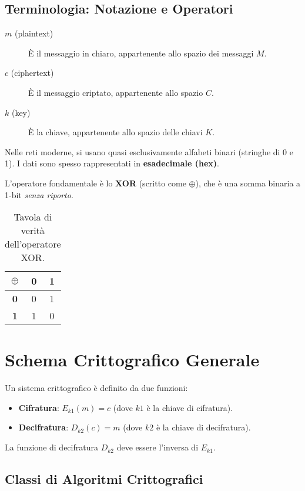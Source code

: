 \documentclass[../main.tex]{subfiles}
\begin{document}
\subsection{Terminologia: Notazione e Operatori}
\begin{description}
    \item[$m$ (plaintext)] È il messaggio in chiaro, appartenente allo spazio dei messaggi $M$.
    \item[$c$ (ciphertext)] È il messaggio criptato, appartenente allo spazio $C$.
    \item[$k$ (key)] È la chiave, appartenente allo spazio delle chiavi $K$.
\end{description}
Nelle reti moderne, si usano quasi esclusivamente alfabeti binari (stringhe di 0 e 1). I dati sono spesso rappresentati in \textbf{esadecimale (hex)}.

L'operatore fondamentale è lo \textbf{XOR} (scritto come $\oplus$), che è una somma binaria a 1-bit \emph{senza riporto}.

\begin{table}[h]
\centering
\begin{tabular}{c|cc}
\textbf{$\oplus$} & \textbf{0} & \textbf{1} \\
\midrule
\textbf{0} & 0 & 1 \\
\textbf{1} & 1 & 0 \\
\end{tabular}
\caption{Tavola di verità dell'operatore XOR.}
\end{table}

\section{Schema Crittografico Generale}
Un sistema crittografico è definito da due funzioni:
\begin{itemize}
    \item \textbf{Cifratura}: $E_{k1}(m) = c$ (dove $k1$ è la chiave di cifratura).
    \item \textbf{Decifratura}: $D_{k2}(c) = m$ (dove $k2$ è la chiave di decifratura).
\end{itemize}
La funzione di decifratura $D_{k2}$ deve essere l'inversa di $E_{k1}$.


\subsection{Classi di Algoritmi Crittografici}
\end{document}
